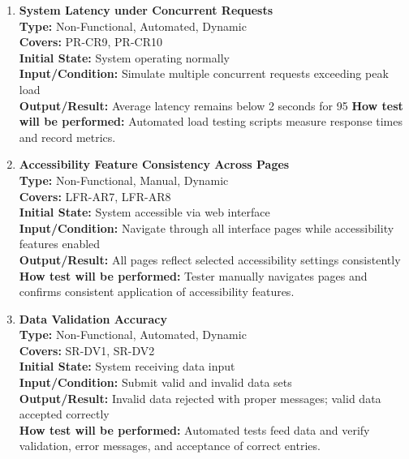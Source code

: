 \documentclass[12pt, titlepage]{article}
\begin{document}
\begin{enumerate}[label=NFR-ST \arabic*., wide=0pt, leftmargin=*]
  \item \textbf{System Latency under Concurrent Requests} \\[2mm]
    \textbf{Type:} Non-Functional, Automated, Dynamic \\
    \textbf{Covers:} PR-CR9, PR-CR10 \\
    \textbf{Initial State:} System operating normally \\
    \textbf{Input/Condition:} Simulate multiple concurrent requests
    exceeding peak load \\
    \textbf{Output/Result:} Average latency remains below 2 seconds
    for 95%
    \textbf{How test will be performed:} Automated load testing
    scripts measure response times and record metrics.

  \item \textbf{Accessibility Feature Consistency Across Pages} \\[2mm]
    \textbf{Type:} Non-Functional, Manual, Dynamic \\
    \textbf{Covers:} LFR-AR7, LFR-AR8 \\
    \textbf{Initial State:} System accessible via web interface \\
    \textbf{Input/Condition:} Navigate through all interface pages
    while accessibility features enabled \\
    \textbf{Output/Result:} All pages reflect selected accessibility
    settings consistently \\[2mm]
    \textbf{How test will be performed:} Tester manually navigates
    pages and confirms consistent application of accessibility features.

  \item \textbf{Data Validation Accuracy} \\[2mm]
    \textbf{Type:} Non-Functional, Automated, Dynamic \\
    \textbf{Covers:} SR-DV1, SR-DV2 \\
    \textbf{Initial State:} System receiving data input \\
    \textbf{Input/Condition:} Submit valid and invalid data sets \\
    \textbf{Output/Result:} Invalid data rejected with proper
    messages; valid data accepted correctly \\[2mm]
    \textbf{How test will be performed:} Automated tests feed data
    and verify validation, error messages, and acceptance of correct entries.


\end{enumerate}
\end{document}

